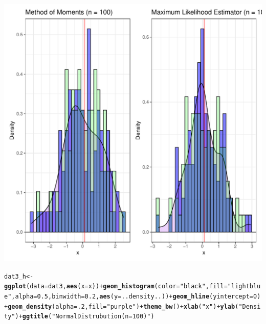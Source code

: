 \documentclass{article}\usepackage[]{graphicx}\usepackage[]{color}
\makeatletter
\def\maxwidth{ %
  \ifdim\Gin@nat@width>\linewidth
    \linewidth
  \else
    \Gin@nat@width
  \fi
}
\newcommand{\hlnum}[1]{\textcolor[rgb]{0.686,0.059,0.569}{#1}}%
\newcommand{\hlstr}[1]{\textcolor[rgb]{0.192,0.494,0.8}{#1}}%
\newcommand{\hlopt}[1]{\textcolor[rgb]{0,0,0}{#1}}%
\newcommand{\hlstd}[1]{\textcolor[rgb]{0.345,0.345,0.345}{#1}}%
\newcommand{\hlkwb}[1]{\textcolor[rgb]{0.69,0.353,0.396}{#1}}%
\newcommand{\hlkwc}[1]{\textcolor[rgb]{0.333,0.667,0.333}{#1}}%
\newcommand{\hlkwd}[1]{\textcolor[rgb]{0.737,0.353,0.396}{\textbf{#1}}}%
\newenvironment{kframe}{%
 \def\at@end@of@kframe{}%
 \ifinner\ifhmode%
  \def\at@end@of@kframe{\end{minipage}}%
  \begin{minipage}{\columnwidth}%
 \fi\fi%
 \def\FrameCommand##1{\hskip\@totalleftmargin \hskip-\fboxsep
 \colorbox{shadecolor}{##1}\hskip-\fboxsep
     \hskip-\linewidth \hskip-\@totalleftmargin \hskip\columnwidth}%
 \MakeFramed {\advance\hsize-\width
   \@totalleftmargin\z@ \linewidth\hsize
   \@setminipage}}%
 {\par\unskip\endMakeFramed%
 \at@end@of@kframe}
\newenvironment{knitrout}{}{} %
\makeatother
\begin{document}
\begin{enumerate}
\begin{enumerate}
\begin{knitrout}
\begin{kframe}
{\ttfamily\noindent\itshape\color{messagecolor}{\#\# `stat\_bin()` using `bins = 30`. Pick better value with `binwidth`.\\\#\# `stat\_bin()` using `bins = 30`. Pick better value with `binwidth`.\\\#\# `stat\_bin()` using `bins = 30`. Pick better value with `binwidth`.\\\#\# `stat\_bin()` using `bins = 30`. Pick better value with `binwidth`.}}\end{kframe}
\includegraphics[width=\maxwidth]{figure/unnamed-chunk-30-1} 
\begin{kframe}\begin{alltt}
\hlstd{dat3_h} \hlkwb{<-} \hlkwd{ggplot}\hlstd{(}\hlkwc{data}\hlstd{=dat3,} \hlkwd{aes}\hlstd{(}\hlkwc{x}\hlstd{=x))}\hlopt{+} \hlkwd{geom_histogram}\hlstd{(}\hlkwc{color}\hlstd{=}\hlstr{"black"}\hlstd{,} \hlkwc{fill} \hlstd{=} \hlstr{"lightblue"}\hlstd{,} \hlkwc{alpha} \hlstd{=} \hlnum{0.5}\hlstd{,} \hlkwc{binwidth} \hlstd{=} \hlnum{0.2}\hlstd{,} \hlkwd{aes}\hlstd{(}\hlkwc{y}\hlstd{=..density..))}\hlopt{+} \hlkwd{geom_hline}\hlstd{(}\hlkwc{yintercept}\hlstd{=}\hlnum{0}\hlstd{)}\hlopt{+} \hlkwd{geom_density}\hlstd{(}\hlkwc{alpha}\hlstd{=}\hlnum{.2}\hlstd{,} \hlkwc{fill}\hlstd{=}\hlstr{"purple"}\hlstd{)} \hlopt{+} \hlkwd{theme_bw}\hlstd{()}\hlopt{+} \hlkwd{xlab}\hlstd{(}\hlstr{"x"}\hlstd{)}\hlopt{+} \hlkwd{ylab}\hlstd{(}\hlstr{"Density"}\hlstd{)}\hlopt{+} \hlkwd{ggtitle}\hlstd{(}\hlstr{"Normal Distrubution (n = 100)"}\hlstd{)}


\end{alltt}
\end{kframe}
\end{knitrout}
\end{enumerate}
\end{enumerate}
\end{document}
